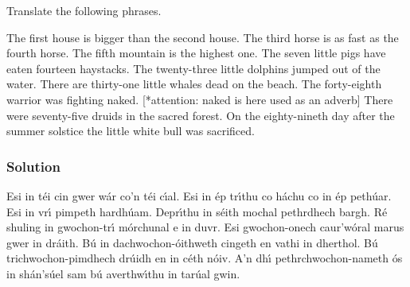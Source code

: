 Translate the following phrases.

The first house is bigger than the second house.
The third horse is as fast as the fourth horse.
The fifth mountain is the highest one.
The seven little pigs have eaten fourteen haystacks.
The twenty-three little dolphins jumped out of the water.
There are thirty-one little whales dead on the beach.
The forty-eighth warrior was fighting naked. [*attention: naked is here used as an adverb]
There were seventy-five druids in the sacred forest.
On the eighty-nineth day after the summer solstice the little white bull was sacrificed.

\newpage
\subsubsection{Solution}

Esi in t\'{e}i cin gwer w\'{a}r co'n t\'{e}i c\'{\i}al.
Esi in \'{e}p tr\'{\i}thu co h\'{a}chu co in \'{e}p peth\'{u}ar.
Esi in vr\'{\i} pimpeth hardh\'{u}am.
Depr\'{\i}thu in s\'{e}ith mochal pethrdhech bargh.
R\'{e} shuling in gwochon-tr\'{\i} m\'{o}rchunal e in duvr.
Esi gwochon-onech caur'w\'{o}ral marus gwer in dr\'{a}ith.
B\'{u} in dachwochon-\'{o}ithweth cingeth en vathi in dherthol.
B\'{u} trichwochon-pimdhech dr\'{u}idh en in c\'{e}th n\'{o}iv.
A'n dh\'{\i} pethrchwochon-nameth \'{o}s in sh\'{a}n's\'{u}el sam b\'{u} averthw\'{\i}thu in tar\'{u}al gwin.

